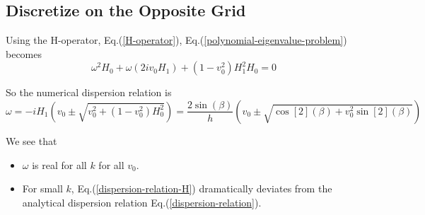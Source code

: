 \subsection{Discretize on the Opposite Grid}
Using the H-operator, Eq.(\ref{H-operator}), Eq.(\ref{polynomial-eigenvalue-problem}) becomes
\[ \omega^2H_0 + \omega(2iv_0H_1) + (1-v_0^2)H_1^2H_0 = 0 \]

So the numerical dispersion relation is
\begin{equation}\label{dispersion-relation-H}
	\omega = -iH_1 \left(v_0 \pm \sqrt{v_0^2 + (1-v_0^2)H_0^2}\right) = \frac{2\sin(\beta)}{h}\left(v_0 \pm \sqrt{\cos[2](\beta) + v_0^2\sin[2](\beta)}\right)
\end{equation}

We see that 
\begin{itemize}
	\item $\omega$ is real for all $k$ for all $v_0$.
	\item For small $k$, Eq.(\ref{dispersion-relation-H}) dramatically deviates from the analytical dispersion relation Eq.(\ref{dispersion-relation}). 
\end{itemize}

